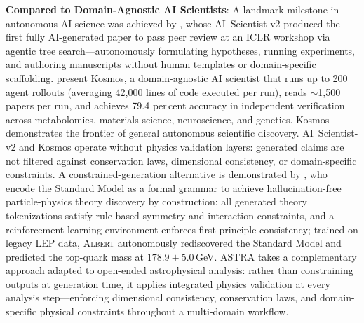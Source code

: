 \documentclass[usenatbib]{rasti}
\begin{document}
\textbf{Compared to Domain-Agnostic AI Scientists}: A landmark milestone in autonomous AI science was achieved by \citet{yamada2025aiscientistv2}, whose AI~Scientist-v2 produced the first fully AI-generated paper to pass peer review at an ICLR workshop via agentic tree search---autonomously formulating hypotheses, running experiments, and authoring manuscripts without human templates or domain-specific scaffolding. \citet{mitchener2025kosmos} present Kosmos, a domain-agnostic AI scientist that runs up to 200 agent rollouts (averaging 42,000 lines of code executed per run), reads $\sim$1,500 papers per run, and achieves 79.4 per\,cent accuracy in independent verification across metabolomics, materials science, neuroscience, and genetics. Kosmos demonstrates the frontier of general autonomous scientific discovery. AI~Scientist-v2 and Kosmos operate without physics validation layers: generated claims are not filtered against conservation laws, dimensional consistency, or domain-specific constraints. A constrained-generation alternative is demonstrated by \citet{alexander2026albert}, who encode the Standard Model as a formal grammar to achieve hallucination-free particle-physics theory discovery by construction: all generated theory tokenizations satisfy rule-based symmetry and interaction constraints, and a reinforcement-learning environment enforces first-principle consistency; trained on legacy LEP data, \textsc{Albert} autonomously rediscovered the Standard Model and predicted the top-quark mass at $178.9 \pm 5.0$\,GeV. ASTRA takes a complementary approach adapted to open-ended astrophysical analysis: rather than constraining outputs at generation time, it applies integrated physics validation at every analysis step---enforcing dimensional consistency, conservation laws, and domain-specific physical constraints throughout a multi-domain workflow.
\end{document}
